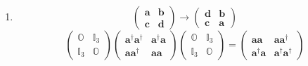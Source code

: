 \documentclass[aps,preprint]{revtex4}
\begin{document}
\begin{enumerate}
\item 
\begin{equation}
\left( 
\begin{array}{cc}
\boldsymbol{a} & \boldsymbol{b} \\ 
\boldsymbol{c} & \boldsymbol{d}%
\end{array}%
\right) \rightarrow \left( 
\begin{array}{cc}
\boldsymbol{d} & \boldsymbol{b} \\ 
\boldsymbol{c} & \boldsymbol{a}%
\end{array}%
\right)
\end{equation}%
\begin{equation}
\left( 
\begin{array}{cc}
\mathbb{O} & \mathbb{I}_{3} \\ 
\mathbb{I}_{3} & \mathbb{O}%
\end{array}%
\right) \left( 
\begin{array}{cc}
\boldsymbol{a}^{\dagger }\boldsymbol{a}^{\dagger } & \boldsymbol{a}^{\dagger
}\boldsymbol{a} \\ 
\boldsymbol{aa}^{\dagger } & \boldsymbol{aa}%
\end{array}%
\right) \left( 
\begin{array}{cc}
\mathbb{O} & \mathbb{I}_{3} \\ 
\mathbb{I}_{3} & \mathbb{O}%
\end{array}%
\right) =\left( 
\begin{array}{cc}
\boldsymbol{aa} & \boldsymbol{aa}^{\dagger } \\ 
\boldsymbol{a}^{\dagger }\boldsymbol{a} & \boldsymbol{a}^{\dagger }%
\boldsymbol{a}^{\dagger }%
\end{array}%
\right)
\end{equation}


\end{enumerate}
\end{document}
